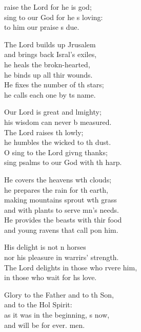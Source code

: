 \settowidth{\versewidth}{The Lord delights in those who revere him, *}
\begin{psalmverse}%
  \begin{patverse}
raise the Lord for he is god;\Flex\\
sing to our God for he \pointup{\i}s loving:\Med\\
to him our praise \pointup{\i}s due.

The Lord builds up Jrusalem\Med\\
and brings back Isral’s exiles,\\
he heals the brokn-hearted,\Med\\
he binds up all thir wounds.\\
He fixes the number of th stars;\Med\\
he calls each one by \pointup{\i}ts name.

Our Lord is great and lmighty;\Med\\
his wisdom can never b measured.\\
The Lord raises th lowly;\Med\\
he humbles the wicked to th dust.\\
O sing to the Lord giv\pointup{\i}ng thanks;\Med\\
sing psalms to our God with th harp.

He covers the heavens w\pointup{\i}th clouds;\Med\\
he prepares the rain for th earth,\\
making mountains sprout w\pointup{\i}th grass\Med\\
and with plants to serve mn’s needs.\\
He provides the beasts with thir food\Med\\
and young ravens that call pon him.

His delight is not \pointup{\i}n horses\Med\\
nor his pleasure in warrirs’ strength.\\
The Lord delights in those who rvere him,\Med\\
in those who wait for h\pointup{\i}s love.

Glory to the Father and to th Son,\Med\\
and to the Hol Spirit:\\
as it was in the beginning, \pointup{\i}s now,\Med\\
and will be for ever. men.
  \end{patverse}
  \end{psalmverse}

